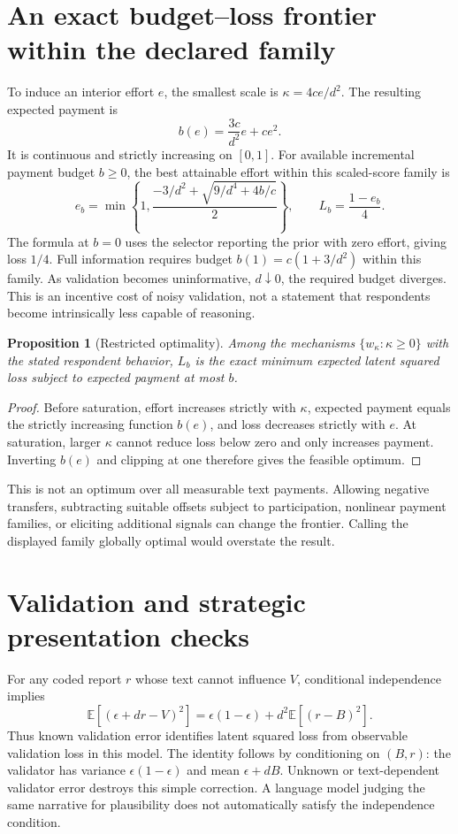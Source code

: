 \documentclass[11pt]{article}
\newtheorem{proposition}{Proposition}
\newcommand{\E}{\mathbb E}
\begin{document}
\section*{An exact budget--loss frontier within the declared family}
To induce an interior effort $e$, the smallest scale is $\kappa=4ce/d^2$. The resulting expected payment is
\[
 b(e)=\frac{3c}{d^2}e+ce^2.
\]
It is continuous and strictly increasing on $[0,1]$. For available incremental payment budget $b\geq0$, the best attainable effort within this scaled-score family is
\[
 e_b=\min\left\{1,
 \frac{-3/d^2+\sqrt{9/d^4+4b/c}}2\right\},
 \qquad L_b=\frac{1-e_b}{4}.
\]
The formula at $b=0$ uses the selector reporting the prior with zero effort, giving loss $1/4$. Full information requires budget $b(1)=c(1+3/d^2)$ within this family. As validation becomes uninformative, $d\downarrow0$, the required budget diverges. This is an incentive cost of noisy validation, not a statement that respondents become intrinsically less capable of reasoning.

\begin{proposition}[Restricted optimality]
Among the mechanisms $\{w_\kappa:\kappa\geq0\}$ with the stated respondent behavior, $L_b$ is the exact minimum expected latent squared loss subject to expected payment at most $b$.
\end{proposition}
\begin{proof}
Before saturation, effort increases strictly with $\kappa$, expected payment equals the strictly increasing function $b(e)$, and loss decreases strictly with $e$. At saturation, larger $\kappa$ cannot reduce loss below zero and only increases payment. Inverting $b(e)$ and clipping at one therefore gives the feasible optimum.
\end{proof}

This is not an optimum over all measurable text payments. Allowing negative transfers, subtracting suitable offsets subject to participation, nonlinear payment families, or eliciting additional signals can change the frontier. Calling the displayed family globally optimal would overstate the result.

\section*{Validation and strategic presentation checks}
For any coded report $r$ whose text cannot influence $V$, conditional independence implies
\[
 \E[(\epsilon+dr-V)^2]=\epsilon(1-\epsilon)
 +d^2\E[(r-B)^2].
\]
Thus known validation error identifies latent squared loss from observable validation loss in this model. The identity follows by conditioning on $(B,r)$: the validator has variance $\epsilon(1-\epsilon)$ and mean $\epsilon+dB$. Unknown or text-dependent validator error destroys this simple correction. A language model judging the same narrative for plausibility does not automatically satisfy the independence condition.
\end{document}
